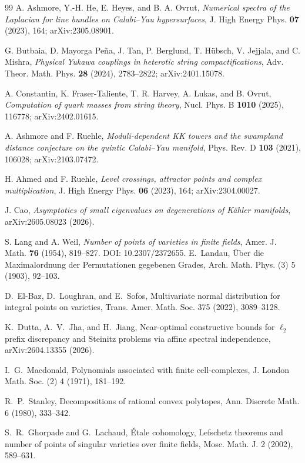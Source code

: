 \documentclass[11pt]{article}
\theoremstyle{definition}
\begin{document}
\begin{thebibliography}{99}
 A. Ashmore, Y.-H. He, E. Heyes, and B. A. Ovrut, \emph{Numerical spectra of the Laplacian for line bundles on Calabi--Yau hypersurfaces}, J. High Energy Phys. \textbf{07} (2023), 164; arXiv:2305.08901.

 G. Butbaia, D. Mayorga Pe\~na, J. Tan, P. Berglund, T. H\"ubsch, V. Jejjala, and C. Mishra, \emph{Physical Yukawa couplings in heterotic string compactifications}, Adv. Theor. Math. Phys. \textbf{28} (2024), 2783--2822; arXiv:2401.15078.

 A. Constantin, K. Fraser-Taliente, T. R. Harvey, A. Lukas, and B. Ovrut, \emph{Computation of quark masses from string theory}, Nucl. Phys. B \textbf{1010} (2025), 116778; arXiv:2402.01615.

 A. Ashmore and F. Ruehle, \emph{Moduli-dependent KK towers and the swampland distance conjecture on the quintic Calabi--Yau manifold}, Phys. Rev. D \textbf{103} (2021), 106028; arXiv:2103.07472.

 H. Ahmed and F. Ruehle, \emph{Level crossings, attractor points and complex multiplication}, J. High Energy Phys. \textbf{06} (2023), 164; arXiv:2304.00027.

 J. Cao, \emph{Asymptotics of small eigenvalues on degenerations of K\"ahler manifolds}, arXiv:2605.08023 (2026).

 S. Lang and A. Weil, \emph{Number of points of varieties in finite fields}, Amer. J. Math. \textbf{76} (1954), 819--827. DOI: 10.2307/2372655.
 E.~Landau, \"Uber die Maximalordnung der Permutationen gegebenen Grades, Arch. Math. Phys. (3) 5 (1903), 92--103.

 D.~El-Baz, D.~Loughran, and E.~Sofos, Multivariate normal distribution for integral points on varieties, Trans. Amer. Math. Soc. 375 (2022), 3089--3128.

 K.~Dutta, A.~V.~Jha, and H.~Jiang, Near-optimal constructive bounds for $\ell_2$ prefix discrepancy and Steinitz problems via affine spectral independence, arXiv:2604.13355 (2026).

 I.~G.~Macdonald, Polynomials associated with finite cell-complexes, J. London Math. Soc. (2) 4 (1971), 181--192.

 R.~P.~Stanley, Decompositions of rational convex polytopes, Ann. Discrete Math. 6 (1980), 333--342.

 S.~R.~Ghorpade and G.~Lachaud, \'Etale cohomology, Lefschetz theorems and number of points of singular varieties over finite fields, Mosc. Math. J. 2 (2002), 589--631.


\end{thebibliography}
\end{document}
